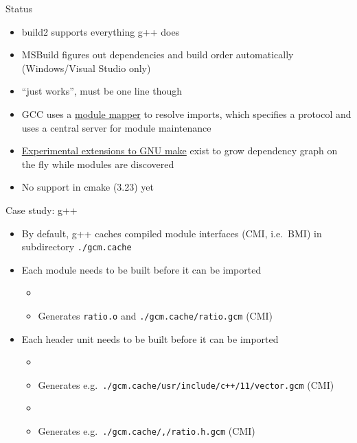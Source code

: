 \begin{frame}[fragile]
    \begin{block}{Status}
      \begin{itemize}
        \item build2 supports everything g++ does
        \item MSBuild figures out dependencies and build order automatically (Windows/Visual Studio only)
        \item {} ``just works'', must be one line though
        \item GCC uses a \href{https://wg21.link/P1184}{module mapper} to resolve imports, which specifies a protocol and uses a central server for module maintenance
        \item \href{https://wg21.link/p1602}{Experimental extensions to GNU make} exist to grow dependency graph on the fly while modules are discovered
        \item No support in cmake (3.23) yet
      \end{itemize}
    \end{block}
\end{frame}

\begin{frame}[fragile]
    \begin{block}{Case study: g++}
      \begin{itemize}
        \item By default, g++ caches compiled module interfaces (CMI, i.e.\ BMI) in subdirectory \texttt{./gcm.cache}
        \item Each module needs to be built before it can be imported
        \begin{itemize}
          \item {\footnotesize {}}
          \item Generates \texttt{ratio.o} and \texttt{./gcm.cache/ratio.gcm} (CMI)
        \end{itemize}
        \item Each header unit needs to be built before it can be imported
        \begin{itemize}
          \item {\footnotesize {}}
          \item Generates e.g.\ \texttt{./gcm.cache/usr/include/c++/11/vector.gcm} (CMI)
          \item {\footnotesize {}}
          \item Generates e.g.\ \texttt{./gcm.cache/,/ratio.h.gcm} (CMI)
        \end{itemize}
      \end{itemize}
    \end{block}
\end{frame}

